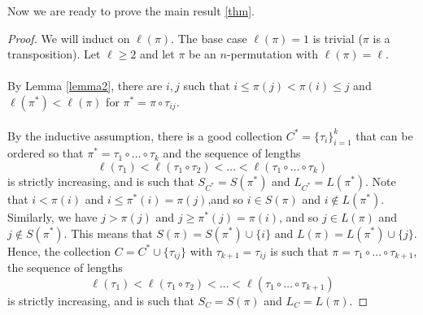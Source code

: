 \documentclass[psamsfonts]{amsart}
\theoremstyle{definition}
\theoremstyle{remark}
\numberwithin{equation}{section}
\begin{document}
Now we are ready to prove the main result \ref{thm}.
\begin{proof}
We will induct on $\ell(\pi)$. The base case $\ell(\pi)=1$ is trivial ($\pi$ is a transposition).
Let $\ell\geq 2$ and let $\pi$ be an $n$-permutation with $\ell(\pi)=\ell$. 
\\
\\
By Lemma \ref{lemma2}, there are $i,j$ such that $i\leq \pi(j)<\pi(i)\leq j$ and $\ell(\pi^*)<\ell(\pi)$ for $\pi^*=\pi\circ \tau_{ij}$.
\\
\\
 By the inductive assumption, there is a good collection $C^*=\{\tau_i\}_{i=1}^k$ that can be ordered so that $\pi^*=\tau_1\circ\ldots\circ\tau_k$ and the sequence of lengths\[\ell(\tau_1)<\ell(\tau_1\circ\tau_2)<\ldots<\ell(\tau_1\circ\ldots\circ\tau_k)\] is strictly increasing, and is such that $S_{C^*}=S(\pi^*)$ and $L_{C^*}=L(\pi^*)$. Note that $i<\pi(i)$ and $i\leq \pi^*(i)=\pi(j)$,and so $i\in S(\pi)$ and $i\notin L(\pi^*)$. Similarly, we have $j>\pi(j)$ and $j\geq \pi^*(j)=\pi(i)$, and so $j\in L(\pi)$ and $j\notin S(\pi^*)$. This means that $S(\pi)=S(\pi^*)\cup\{i\}$ and $L(\pi)=L(\pi^*)\cup\{j\}$. Hence, the collection $C=C^*\cup\{\tau_{ij}\}$ with $\tau_{k+1}=\tau_{ij}$ is such that $\pi=\tau_1\circ\ldots\circ \tau_{k+1}$, the sequence of lengths\[\ell(\tau_1)<\ell(\tau_1\circ\tau_2)<\ldots<\ell(\tau_1\circ\ldots\circ\tau_{k+1})\] is strictly increasing, and is such that $S_{C}=S(\pi)$ and $L_{C}=L(\pi)$.
\end{proof}
\end{document}
